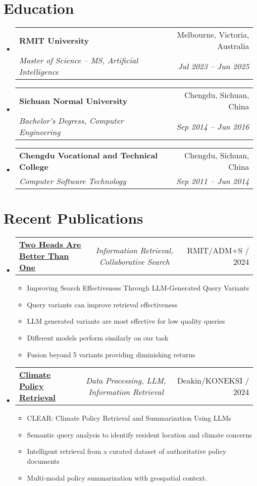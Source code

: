 \documentclass[a4paper,11pt]{article}
\makeatletter
\newcommand{\resumeItem}[1]{
  \item\small{#1}
}
\newcommand{\resumeItemListStart}{\begin{itemize}[rightmargin=0.11in]}
\newcommand{\resumeItemListEnd}{\end{itemize}}
\newcommand{\resumeTrioHeading}[3]{
  \item\small{
    \begin{tabular*}{0.96\textwidth}[t]{
      l@{\extracolsep{\fill}}c@{\extracolsep{\fill}}r
    }
      \textbf{#1} & \textit{#2} & #3
    \end{tabular*}
  }
}
\newcommand{\resumeQuadHeading}[4]{
  \item
  \begin{tabular*}{0.96\textwidth}[t]{l@{\extracolsep{\fill}}r}
    \textbf{#1} & #2 \\
    \textit{\small#3} & \textit{\small #4} \\
  \end{tabular*}
}
\newcommand{\resumeHeadingListStart}{
  \begin{itemize}[leftmargin=0.15in, label={}]
}
\newcommand{\resumeHeadingListEnd}{\end{itemize}}
\makeatother
\begin{document}

\section{Education}
  \resumeHeadingListStart{}
    \resumeQuadHeading{RMIT University}{Melbourne, Victoria, Australia}
    {Master of Science -- MS, Artificial Intelligence}{Jul 2023 -- Jun 2025}
    \resumeQuadHeading{Sichuan Normal University}{Chengdu, Sichuan, China}
    {Bachelor's Degress, Computer Engineering}{Sep 2014 -- Jun 2016}
    \resumeQuadHeading{Chengdu Vocational and Technical College}{Chengdu, Sichuan, China}
    {Computer Software Technology}{Sep 2011 -- Jun 2014}
  \resumeHeadingListEnd{}

\section{Recent Publications}
  \resumeHeadingListStart{}
      \resumeTrioHeading{\href{https://dl.acm.org/doi/10.1145/3698204.3716468}{\uline{Two Heads Are Better Than One}}}{Information Retrieval, Collaborative Search}{RMIT/ADM+S / 2024}
      \resumeItemListStart{}
        \resumeItem{Improving Search Effectiveness Through LLM-Generated Query Variants}
        \resumeItem{Query variants can improve retrieval effectiveness}
        \resumeItem{LLM generated variants are most effective for low quality queries}
        \resumeItem{Different models perform similarly on our task}
        \resumeItem{Fusion beyond 5 variants providing diminishing returns}
      \resumeItemListEnd{}

    \resumeTrioHeading{\href{https://counterinfodemic.org/}{\uline{Climate Policy Retrieval}}}{Data Processing, LLM, Information Retrieval}{Deakin/KONEKSI / 2024}
      \resumeItemListStart{}
        \resumeItem{CLEAR: Climate Policy Retrieval and Summarization Using LLMs}
        \resumeItem{Semantic query analysis to identify resident location and climate concerns}
        \resumeItem{Intelligent retrieval from a curated dataset of authoritative policy documents}
        \resumeItem{Multi-modal policy summarization with geospatial context.}
      \resumeItemListEnd{}
  \resumeHeadingListEnd{}

\end{document}
